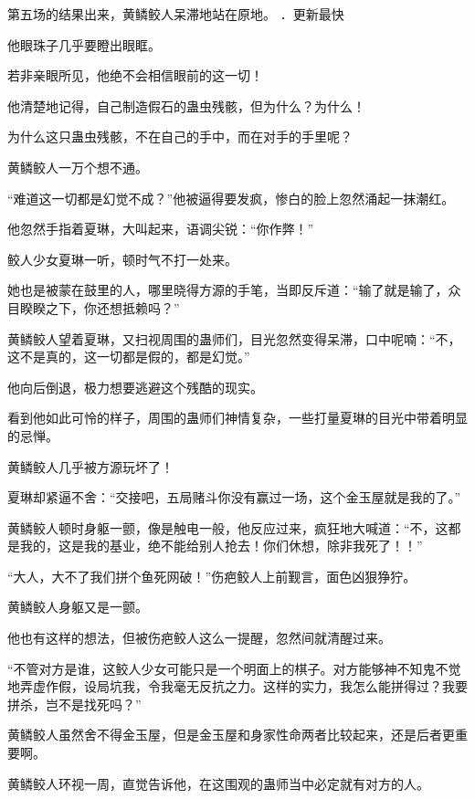 
\begin{this_body}



第五场的结果出来，黄鳞鲛人呆滞地站在原地。 ．更新最快

他眼珠子几乎要瞪出眼眶。

若非亲眼所见，他绝不会相信眼前的这一切！

他清楚地记得，自己制造假石的蛊虫残骸，但为什么？为什么！

为什么这只蛊虫残骸，不在自己的手中，而在对手的手里呢？

黄鳞鲛人一万个想不通。

“难道这一切都是幻觉不成？”他被逼得要发疯，惨白的脸上忽然涌起一抹潮红。

他忽然手指着夏琳，大叫起来，语调尖锐：“你作弊！”

鲛人少女夏琳一听，顿时气不打一处来。

她也是被蒙在鼓里的人，哪里晓得方源的手笔，当即反斥道：“输了就是输了，众目睽睽之下，你还想抵赖吗？”

黄鳞鲛人望着夏琳，又扫视周围的蛊师们，目光忽然变得呆滞，口中呢喃：“不，这不是真的，这一切都是假的，都是幻觉。”

他向后倒退，极力想要逃避这个残酷的现实。

看到他如此可怜的样子，周围的蛊师们神情复杂，一些打量夏琳的目光中带着明显的忌惮。

黄鳞鲛人几乎被方源玩坏了！

夏琳却紧逼不舍：“交接吧，五局赌斗你没有赢过一场，这个金玉屋就是我的了。”

黄鳞鲛人顿时身躯一颤，像是触电一般，他反应过来，疯狂地大喊道：“不，这都是我的，这是我的基业，绝不能给别人抢去！你们休想，除非我死了！！”

“大人，大不了我们拼个鱼死网破！”伤疤鲛人上前觐言，面色凶狠狰狞。

黄鳞鲛人身躯又是一颤。

他也有这样的想法，但被伤疤鲛人这么一提醒，忽然间就清醒过来。

“不管对方是谁，这鲛人少女可能只是一个明面上的棋子。对方能够神不知鬼不觉地弄虚作假，设局坑我，令我毫无反抗之力。这样的实力，我怎么能拼得过？我要拼杀，岂不是找死吗？”

黄鳞鲛人虽然舍不得金玉屋，但是金玉屋和身家性命两者比较起来，还是后者更重要啊。

黄鳞鲛人环视一周，直觉告诉他，在这围观的蛊师当中必定就有对方的人。


\end{this_body}
